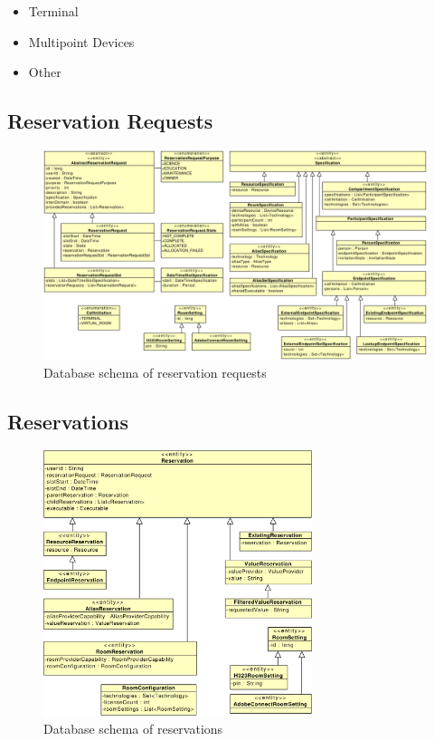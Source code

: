 \begin{itemize}
\item Terminal
\item Multipoint Devices
\item Other
\end{itemize}

\subsection{Reservation Requests}

\begin{figure}[ht!]
\includegraphics[width=\textwidth]{diagrams/cd_reservation_requests}
\caption{Database schema of reservation requests}
\label{fig:reservation-requests}
\end{figure}

\subsection{Reservations}

\begin{figure}[ht!]
\centering\includegraphics[width=0.7\textwidth]{diagrams/cd_reservations}
\caption{Database schema of reservations}
\label{fig:reservations}
\end{figure}

